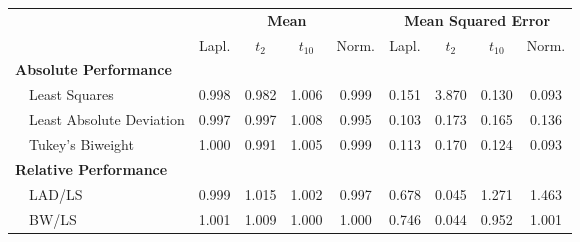 %
\begin{center}
\begin{tabular}{|l||c|c|c|c||c|c|c|c|} \hline
\multicolumn{1}{|l||}{\bf }&\multicolumn{4}{c||}{\bf Mean}&\multicolumn{4}{c|}{\bf Mean Squared Error}\\ \cline{2-9}
\multicolumn{1}{|l||}{}&\multicolumn{1}{c|}{Lapl.}&\multicolumn{1}{c|}{$t_2$}&\multicolumn{1}{c|}{$t_{10}$}&\multicolumn{1}{c||}{Norm.}&\multicolumn{1}{c|}{Lapl.}&\multicolumn{1}{c|}{$t_2$}&\multicolumn{1}{c|}{$t_{10}$}&\multicolumn{1}{c|}{Norm.}\\ \hline
{\bf Absolute Performance}&&&&&&&&\\
~~Least Squares&0.998&0.982&1.006&0.999&0.151&3.870&0.130&0.093\\ 
~~Least Absolute Deviation&0.997&0.997&1.008&0.995&0.103&0.173&0.165&0.136\\ 
~~Tukey's Biweight&1.000&0.991&1.005&0.999&0.113&0.170&0.124&0.093\\ \hline
{\bf Relative Performance}&&&&&&&&\\
~~LAD/LS&0.999&1.015&1.002&0.997&0.678&0.045&1.271&1.463\\ 
~~BW/LS&1.001&1.009&1.000&1.000&0.746&0.044&0.952&1.001\\ 
\hline
\end{tabular}
\end{center}
